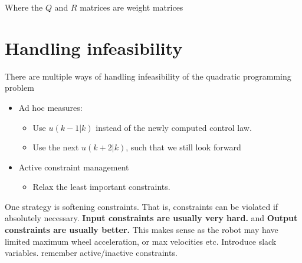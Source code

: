 \documentclass[a4paper]{article}
\begin{document}
Where the $ Q $ and  $ R $ matrices are weight matrices


\section{Handling infeasibility}
There are multiple ways of handling infeasibility of the quadratic programming problem 
\begin{itemize}
	\item Ad hoc measures:
		\begin{itemize}
			\item Use $ u(k - 1|k) $ instead of the newly computed control law.
			\item Use the next $ u(k + 2 | k) $, such that we still look forward
		\end{itemize}
	\item Active constraint management
		\begin{itemize}
			\item Relax the least important constraints. 
		\end{itemize}
\end{itemize}
One strategy is softening constraints. That is, constraints can be violated if absolutely necessary. 
\textbf{Input constraints are usually very hard.} and \textbf{Output constraints are usually better.} 
This makes sense as the robot may have limited maximum wheel acceleration, or max velocities etc. 
Introduce slack variables. 
remember active/inactive constraints. 
\end{document}
